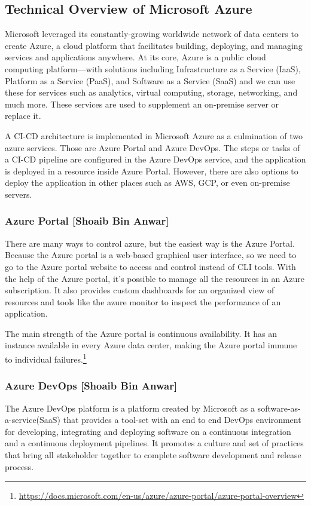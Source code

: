 \subsection{Technical Overview of Microsoft Azure}
%
Microsoft leveraged its constantly-growing worldwide network of data centers to create Azure, a cloud platform that facilitates building, deploying, and managing services and applications anywhere. At its core, Azure is a public cloud computing platform—with solutions including Infrastructure as a Service (IaaS), Platform as a Service (PaaS), and Software as a Service (SaaS) and we can use these for services such as analytics, virtual computing, storage, networking, and much more. These services are used to supplement an on-premise server or replace it.

A CI-CD architecture is implemented in Microsoft Azure as a culmination of two azure services. Those are Azure Portal and Azure DevOps. The steps or tasks of a CI-CD pipeline are configured in the Azure DevOps service, and the application is deployed in a resource inside Azure Portal. However, there are also options to deploy the application in other places such as AWS, GCP, or even on-premise servers. 
%

\subsubsection{Azure Portal [Shoaib Bin Anwar]}
%
There are many ways to control azure, but the easiest way is the Azure Portal. Because the Azure portal is a web-based graphical user interface, so we need to go to the Azure portal website to access and control instead of CLI tools. With the help of the Azure portal, it's possible to manage all the resources in an Azure subscription. It also provides custom dashboards for an organized view of resources and tools like the azure monitor to inspect the performance of an application.

The main strength of the Azure portal is continuous availability. It has an instance available in every Azure data center, making the Azure portal immune to individual failures.\footnote{\url{https://docs.microsoft.com/en-us/azure/azure-portal/azure-portal-overview}}
%

\subsubsection{Azure DevOps [Shoaib Bin Anwar]}
%
The Azure DevOps platform is a platform created by Microsoft as a software-as-a-service(SaaS) that provides a tool-set with an end to end DevOps environment for developing, integrating and deploying software on a continuous integration and a continuous deployment pipelines. It promotes a culture and set of practices  that bring all stakeholder together to complete software development and release process. 

